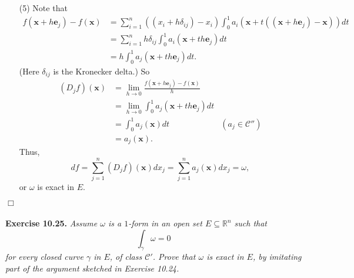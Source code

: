 \documentclass{article}
\begin{document}
\begin{enumerate}
\item[(5)]
  Note that
  \begin{align*}
    f(\mathbf{x} + h \mathbf{e}_j) - f(\mathbf{x})
    &= \sum_{i=1}^{n} ((x_i + h\delta_{ij}) - x_i)
      \int_{0}^{1} a_i(\mathbf{x} + t((\mathbf{x} + h \mathbf{e}_j)-\mathbf{x})) dt \\
    &= \sum_{i=1}^{n} h\delta_{ij}
      \int_{0}^{1} a_i(\mathbf{x} + th \mathbf{e}_j) dt \\
    &= h \int_{0}^{1} a_j(\mathbf{x} + th \mathbf{e}_j) dt.
  \end{align*}
  (Here $\delta_{ij}$ is the Kronecker delta.)
  So
  \begin{align*}
    (D_j f)(\mathbf{x})
    &= \lim_{h \to 0}
      \frac{f(\mathbf{x} + h \mathbf{e}_j) - f(\mathbf{x})}{h} \\
    &= \lim_{h \to 0}
      \int_{0}^{1} a_j(\mathbf{x} + th \mathbf{e}_j) dt \\
    &= \int_{0}^{1} a_j(\mathbf{x}) dt
      &(a_j \in \mathscr{C}'') \\
    &= a_j(\mathbf{x}).
  \end{align*}
  Thus,
  \[
    df
    = \sum_{j=1}^{n} (D_j f)(\mathbf{x}) dx_j
    = \sum_{j=1}^{n} a_j(\mathbf{x}) dx_j
    = \omega,
  \]
  or $\omega$ is exact in $E$.
\end{enumerate}
$\Box$ \\\\






\textbf{Exercise 10.25.}
\emph{Assume $\omega$ is a $1$-form in an open set $E \subseteq \mathbb{R}^n$
such that
\[
  \int_{\gamma} \omega = 0
\]
for every closed curve $\gamma$ in $E$, of class $\mathscr{C}'$.
Prove that $\omega$ is exact in $E$,
by imitating part of the argument sketched in Exercise 10.24.} \\
\end{document}

